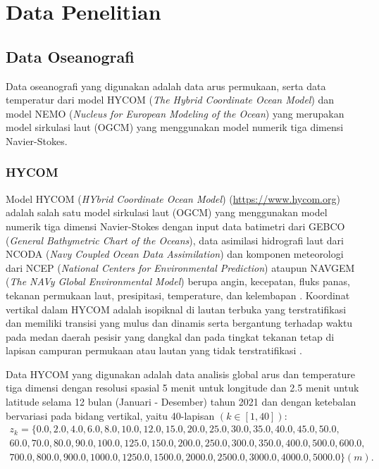 \section[Data Penelitian]{Data Penelitian}
\begin{spacing}{1.5}
\vspace{-1pc}
\subsection[Data Oseanografi]{Data Oseanografi}
	Data oseanografi yang digunakan adalah data arus permukaan, serta data temperatur dari model HYCOM (\textit{The Hybrid Coordinate Ocean Model}) dan model NEMO (\textit{Nucleus for European Modeling of the Ocean}) yang merupakan model sirkulasi laut (OGCM) yang menggunakan model numerik tiga dimensi Navier-Stokes.

\subsubsection[HYCOM]{HYCOM}
	Model HYCOM (\textit{HYbrid Coordinate Ocean Model}) (\href{https://www.hycom.org}{https://www.hycom.org}) adalah salah satu model sirkulasi laut (OGCM) yang menggunakan model numerik tiga dimensi Navier-Stokes dengan input data batimetri dari GEBCO (\textit{General Bathymetric Chart of the Oceans}), data asimilasi hidrografi laut dari NCODA (\textit{Navy Coupled Ocean Data Assimilation}) dan komponen meteorologi dari NCEP (\textit{National Centers for Environmental Prediction}) ataupun NAVGEM (\textit{The NAVy Global Environmental Model}) berupa angin, kecepatan, fluks panas, tekanan permukaan laut, presipitasi, temperature, dan kelembapan . Koordinat vertikal dalam HYCOM adalah isopiknal di lautan terbuka yang terstratifikasi dan memiliki transisi yang mulus dan dinamis serta bergantung terhadap waktu pada medan daerah pesisir yang dangkal dan pada tingkat tekanan tetap di lapisan campuran permukaan atau lautan yang tidak terstratifikasi . 
	\par Data HYCOM yang digunakan adalah data analisis global arus dan temperature tiga dimensi dengan resolusi spasial 5 menit untuk longitude dan 2.5 menit untuk latitude selama 12 bulan (Januari - Desember) tahun 2021 dan dengan ketebalan bervariasi pada bidang vertikal, yaitu 40-lapisan $(k \in [1,40])$:
	\begin{equation*}
		\begin{aligned}
			z_k = \{0.0, 2.0, 4.0, 6.0, 8.0, 10.0, 12.0, 15.0, 20.0, 25.0, 30.0, 35.0, 40.0, 45.0, 50.0, \\
			60.0, 70.0,	80.0, 90.0, 100.0, 125.0, 150.0, 200.0, 250.0, 300.0, 350.0, 400.0, 500.0, 600.0,\\
			700.0, 800.0, 900.0, 1000.0, 1250.0, 1500.0, 2000.0, 2500.0, 3000.0, 4000.0, 5000.0\} (m). \\
		\end{aligned}
	\end{equation*}


\end{spacing}
